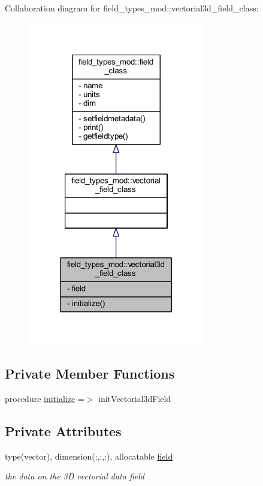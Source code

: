 Collaboration diagram for field\+\_\+types\+\_\+mod\+:\+:vectorial3d\+\_\+field\+\_\+class\+:\nopagebreak
\begin{figure}[H]
\begin{center}
\leavevmode
\includegraphics[width=219pt]{structfield__types__mod_1_1vectorial3d__field__class__coll__graph}
\end{center}
\end{figure}
\subsection*{Private Member Functions}
\begin{DoxyCompactItemize}
\item 
procedure \mbox{\hyperlink{structfield__types__mod_1_1vectorial3d__field__class_a219c7d1c8e49593aa1616ed50253a6cc}{initialize}} =$>$ init\+Vectorial3d\+Field
\end{DoxyCompactItemize}
\subsection*{Private Attributes}
\begin{DoxyCompactItemize}
\item 
type(vector), dimension(\+:,\+:,\+:), allocatable \mbox{\hyperlink{structfield__types__mod_1_1vectorial3d__field__class_a9edbb4fe466c94b401cad9cff1a910de}{field}}
\begin{DoxyCompactList}\small\item\em the data on the 3D vectorial data field \end{DoxyCompactList}\end{DoxyCompactItemize}


